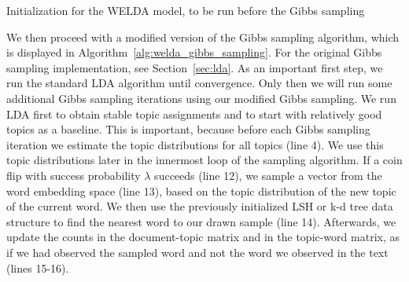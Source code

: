 \documentclass[
        a4paper,
        titlepage,
        twoside,
        parskip,
        numbers=noenddot
        ]{scrbook}
\theoremstyle{break}
\begin{document}

\begin{algorithm}
  \caption{Initialization for the WELDA model, to be run before the Gibbs sampling}
  \label{alg:welda_init}
  \begin{algorithmic}[1]
    \EndFor
    \EndProcedure
  \end{algorithmic}
\end{algorithm}

We then proceed with a modified version of the Gibbs sampling algorithm, which is displayed in Algorithm~\ref{alg:welda_gibbs_sampling}.
For the original Gibbs sampling implementation, see Section~\ref{sec:lda}.
As an important first step, we run the standard LDA algorithm until convergence.
Only then we will run some additional Gibbs sampling iterations using our modified Gibbs sampling.
We run LDA first to obtain stable topic assignments and to start with relatively good topics as a baseline.
This is important, because before each Gibbs sampling iteration we estimate the topic distributions for all topics (line 4).
We use this topic distributions later in the innermost loop of the sampling algorithm.
If a coin flip with success probability $\lambda$ succeeds (line 12), we sample a vector from the word embedding space (line 13), based on the topic distribution of the new topic of the current word.
We then use the previously initialized LSH or k-d tree data structure to find the nearest word to our drawn sample (line 14).
Afterwards, we update the counts in the document-topic matrix and in the topic-word matrix, as if we had observed the sampled word and not the word we observed in the text (lines 15-16).
\end{document}
